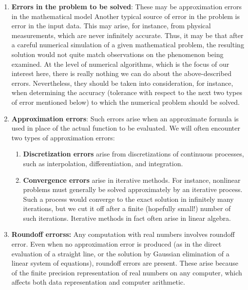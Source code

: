 \documentclass{report}
\begin{document}
\begin{itemize}
            \begin{enumerate}
                \item \textbf{Errors in the problem to be solved}: These may be approximation errors in the mathematical model
                    \bigbreak \noindent 
                    Another typical source of error in the problem is error in the input data. This may arise, for instance, from physical measurements, which are never infinitely accurate. Thus, it may be that after a careful numerical simulation of a given mathematical problem, the resulting solution would not quite match observations on the phenomenon being examined.
                    \bigbreak \noindent 
                    At the level of numerical algorithms, which is the focus of our interest here, there is really nothing we can do about the above-described errors. Nevertheless, they should be taken into consideration, for instance, when determining the accuracy (tolerance with respect to the next two types of error mentioned below) to which the numerical problem should be solved.
                \item  \textbf{Approximation errors}: Such errors arise when an approximate formula is used in place of the actual function to be evaluated.
                    \bigbreak \noindent 
                    We will often encounter two types of approximation errors:
                    \begin{enumerate}
                        \item \textbf{Discretization errors} arise from discretizations of continuous processes, such as interpolation, differentiation, and integration.
                        \item \textbf{Convergence errors} arise in iterative methods. For instance, nonlinear problems must generally be solved approximately by an iterative process. Such a process would converge to the exact solution in infinitely many iterations, but we cut it off after a finite (hopefully small!) number of such iterations. Iterative methods in fact often arise in linear algebra.
                    \end{enumerate}
                \item \textbf{Roundoff errorss:} Any computation with real numbers involves roundoff error. Even when no approximation error is produced (as in the direct evaluation of a straight line, or the solution by Gaussian elimination of a linear system of equations), roundoff errors are present. These arise because of the finite precision representation of real numbers on any computer, which affects both data representation and computer arithmetic.

\end{enumerate}
\end{itemize}
\end{document}
